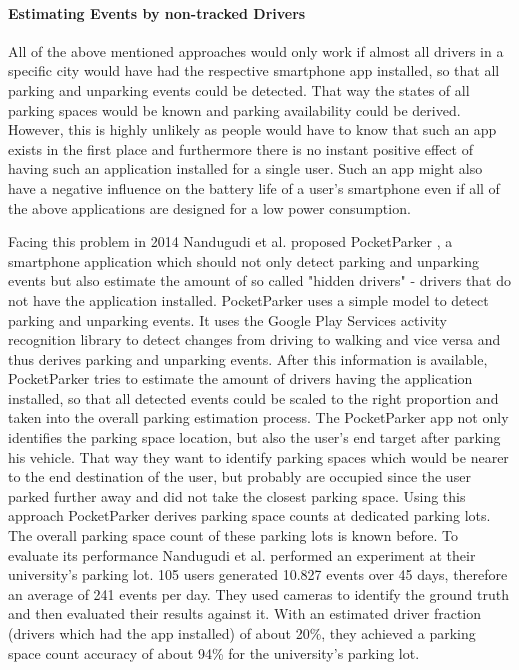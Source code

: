 \paragraph{Estimating Events by non-tracked Drivers}

All of the above mentioned approaches would only work if almost all drivers in a specific city would have had the respective smartphone app installed, so that all parking and unparking events could be detected. That way the states of all parking spaces would be known and parking availability could be derived. However, this is highly unlikely as people would have to know that such an app exists in the first place and furthermore there is no instant positive effect of having such an application installed for a single user. Such an app might also have a negative influence on the battery life of a user's smartphone even if all of the above applications are designed for a low power consumption. 

Facing this problem in 2014 Nandugudi et al. proposed PocketParker \cite{Nandugudi:2014:PPP:2632048.2632098}, a smartphone application which should not only detect parking and unparking events but also estimate the amount of so called "hidden drivers" - drivers that do not have the application installed. PocketParker uses a simple model to detect parking and unparking events. It uses the Google Play Services activity recognition library to detect changes from driving to walking and vice versa and thus derives parking and unparking events. After this information is available, PocketParker tries to estimate the amount of drivers having the application installed, so that all detected events could be scaled to the right proportion and taken into the overall parking estimation process. The PocketParker app not only identifies the parking space location, but also the user's end target after parking his vehicle. That way they want to identify parking spaces which would be nearer to the end destination of the user, but probably are occupied since the user parked further away and did not take the closest parking space. Using this approach PocketParker derives parking space counts at dedicated parking lots. The overall parking space count of these parking lots is known before. To evaluate its performance Nandugudi et al. performed an experiment at their university's parking lot. 105 users generated 10.827 events over 45 days, therefore an average of 241 events per day. They used cameras to identify the ground truth and then evaluated their results against it. With an estimated driver fraction (drivers which had the app installed) of about 20\%, they achieved a parking space count accuracy of about 94\% for the university's parking lot.

